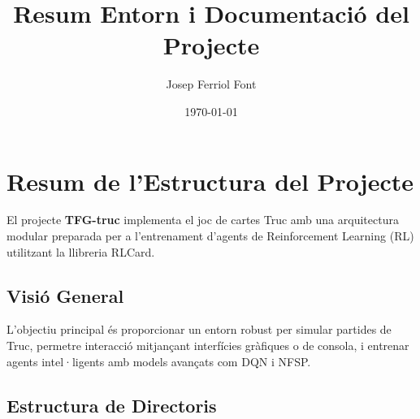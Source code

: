 \documentclass[a4paper,11pt]{report}
\title{Resum Entorn i Documentació del Projecte}
\author{Josep Ferriol Font}
\date{\today}
\begin{document}
\maketitle
\tableofcontents

\chapter{Resum de l'Estructura del Projecte}

El projecte \textbf{TFG-truc} implementa el joc de cartes Truc amb una arquitectura modular preparada per a l'entrenament d'agents de Reinforcement Learning (RL) utilitzant la llibreria RLCard.

\section*{Visió General}
L'objectiu principal és proporcionar un entorn robust per simular partides de Truc, permetre interacció mitjançant interfícies gràfiques o de consola, i entrenar agents intel·ligents amb models avançats com DQN i NFSP.

\section*{Estructura de Directoris}
\end{document}
